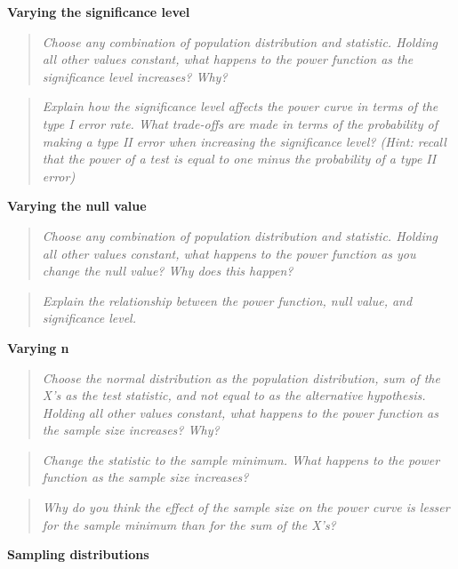 \documentclass{TISE}
\begin{document}
\textbf{Varying the significance level}

\begin{quote}
	\textit{Choose any combination of population distribution and statistic. Holding all other values constant, what happens to the power function as the significance level increases? Why?}
\end{quote}

\begin{quote}
	\textit{Explain how the significance level affects the power curve in terms of the type I error rate. What trade-offs are made in terms of the probability of making a type II error when increasing the significance level? (Hint: recall that the power of a test is equal to one minus the probability of a type II error)}
\end{quote}

\textbf{Varying the null value}

\begin{quote}
	\textit{Choose any combination of population distribution and statistic. Holding all other values constant, what happens to the power function as you change the null value? Why does this happen?}
\end{quote}

\begin{quote}
	\textit{Explain the relationship between the power function, null value, and significance level.}
\end{quote}

\textbf{Varying n}

\begin{quote}
	\textit{Choose the normal distribution as the population distribution, sum of the X's as the test statistic, and not equal to as the alternative hypothesis. Holding all other values constant, what happens to the power function as the sample size increases? Why?}
\end{quote}

\begin{quote}
	\textit{Change the statistic to the sample minimum. What happens to the power function as the sample size increases?}
\end{quote}

\begin{quote}
	\textit{Why do you think the effect of the sample size on the power curve is lesser for the sample minimum than for the sum of the X's?}
\end{quote}

\textbf{Sampling distributions}
\end{document}

